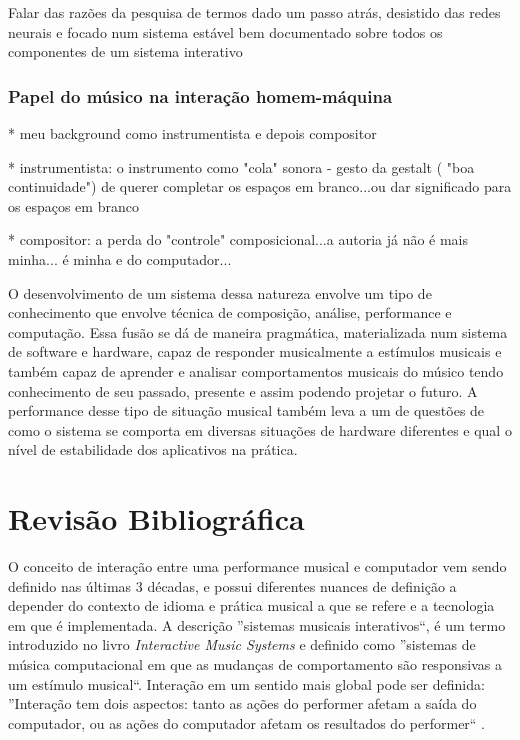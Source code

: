 \documentclass[draft]{ppgmus}
\begin{document}
Falar das razões da pesquisa de termos dado um passo atrás, desistido
das redes neurais e focado num sistema estável bem documentado sobre todos
os componentes de um sistema interativo
 



\subsection{Papel do músico na interação homem-máquina}

* meu background como instrumentista e depois compositor

* instrumentista: o instrumento como "cola" sonora - gesto da gestalt ( "boa continuidade") de querer
completar os espaços em branco...ou dar significado para os espaços em branco

* compositor: a perda do "controle" composicional...a autoria já não é mais minha...
é minha e do computador...




O desenvolvimento de um sistema dessa natureza envolve um tipo de conhecimento que envolve técnica de
 composição, análise, performance e computação.
 Essa fusão se dá de maneira pragmática, materializada num sistema de software e hardware, capaz de 
responder musicalmente a estímulos musicais e também capaz de aprender e analisar comportamentos musicais do músico tendo 
conhecimento de seu
passado, presente e assim podendo projetar o futuro. A performance desse tipo de situação musical também leva a um  de questões
de como o sistema se comporta em diversas situações de hardware diferentes e qual 
o nível de estabilidade dos aplicativos na prática.





\chapter{Revisão Bibliográfica}
\label{sec:rev}

O conceito de interação entre uma performance musical e computador vem
sendo definido nas últimas 3 décadas, e possui diferentes nuances de definição
a depender do contexto de idioma e prática musical a que se refere e a tecnologia
em que é implementada. A descrição ''sistemas musicais interativos``, é um
termo introduzido no livro \textit{Interactive Music Systems} 
\cite{rowe93:interactive} e definido como ''sistemas de música 
computacional em que as mudanças de comportamento são responsivas a um
estímulo musical``. Interação em um sentido mais global pode ser definida: 
  ''Interação tem dois aspectos:
tanto as ações do performer afetam a saída do computador, ou as ações do computador
afetam os resultados do performer`` \cite{garnett:2001}.
\end{document}
